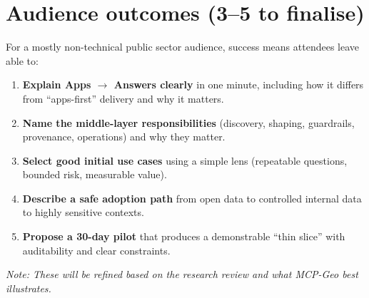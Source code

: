 \section{Audience outcomes (3--5 to finalise)}

For a mostly non-technical public sector audience, success means attendees leave able to:
\begin{enumerate}[leftmargin=*]
  \item \textbf{Explain Apps $\rightarrow$ Answers clearly} in one minute, including how it differs from ``apps-first'' delivery and why it matters.
  \item \textbf{Name the middle-layer responsibilities} (discovery, shaping, guardrails, provenance, operations) and why they matter.
  \item \textbf{Select good initial use cases} using a simple lens (repeatable questions, bounded risk, measurable value).
  \item \textbf{Describe a safe adoption path} from open data to controlled internal data to highly sensitive contexts.
  \item \textbf{Propose a 30-day pilot} that produces a demonstrable ``thin slice'' with auditability and clear constraints.
\end{enumerate}

\noindent\textit{Note: These will be refined based on the research review and what MCP-Geo best illustrates.}

